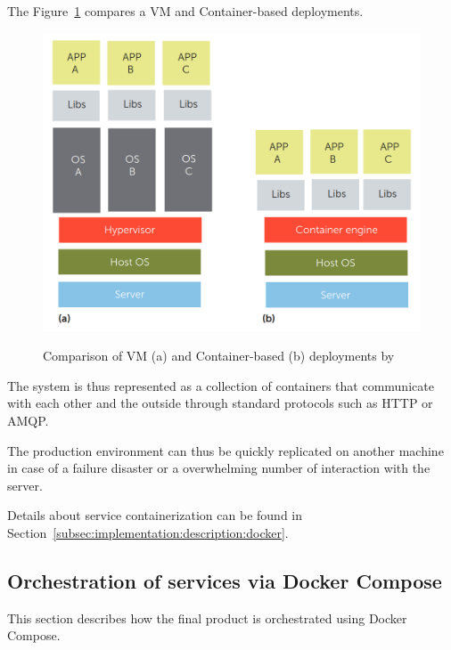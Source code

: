 The Figure~\ref{fig:implementation:decisions:docker:contvsvm} compares a \gls{VM} and Container-based deployments.

\begin{figure}[H]
    \centering
    \resizebox{0.7\columnwidth}{!}
    {
       \includegraphics{assets/figures/vmvscontainer.png}
    }
    \caption[Comparison of VM and Container-based deployments]{Comparison of VM (a) and Container-based (b) deployments by \cite{bernstein2014containers}}
    \label{fig:implementation:decisions:docker:contvsvm}
\end{figure}

The system is thus represented as a collection of containers that communicate with each other and the outside through standard protocols such as HTTP or \gls{AMQP}.

The production environment can thus be quickly replicated on another machine in case of a failure disaster or a overwhelming number of interaction with the server.

Details about service containerization can be found in Section~\ref{subsec:implementation:description:docker}.

\subsection{Orchestration of services via Docker Compose}
\label{subsec:implementation:decisions:compose}

This section describes how the final product is orchestrated using Docker Compose.

